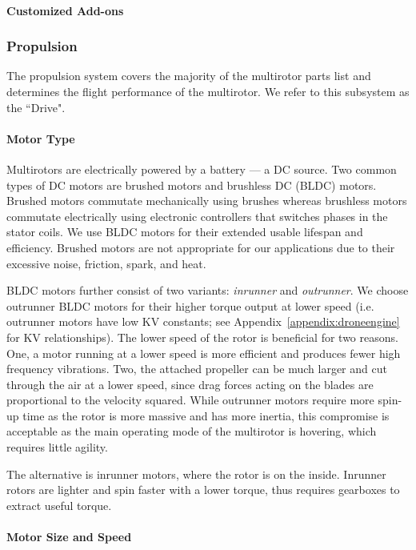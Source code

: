 \paragraph{Customized Add-ons}

\subsubsection{Propulsion}

The propulsion system covers the majority of the multirotor parts list and determines the flight performance of the multirotor. We refer to this subsystem as the ``Drive".

\paragraph{Motor Type}

Multirotors are electrically powered by a battery --- a DC source. Two common types of DC motors are  brushed motors and brushless DC (BLDC) motors. Brushed motors commutate mechanically using brushes whereas brushless motors commutate electrically using electronic controllers that switches phases in the stator coils. We use BLDC motors for their extended usable lifespan and efficiency. Brushed motors are not appropriate for our applications due to their excessive noise, friction, spark, and heat.

BLDC motors further consist of two variants: \textit{inrunner} and \textit{outrunner}. We choose outrunner BLDC motors for their higher torque output at lower speed  (i.e. outrunner motors have low KV constants; see Appendix~\ref{appendix:droneengine} for KV relationships). The lower speed of the rotor is beneficial for two reasons. One, a motor running at a lower speed is more efficient and produces fewer high frequency vibrations. Two, the attached propeller can be much larger and cut through the air at a lower speed, since drag forces acting on the blades are proportional to the velocity squared. While outrunner motors require more spin-up time as the rotor is more massive and has more inertia, this compromise is acceptable as the main operating mode of the multirotor is hovering, which requires little agility. 

The alternative is inrunner motors, where the rotor is on the inside. Inrunner rotors are lighter and spin faster with a lower torque, thus requires gearboxes to extract useful torque\cite{invsoutrunner}.

\paragraph{Motor Size and Speed}\label{section:motor-speed}

